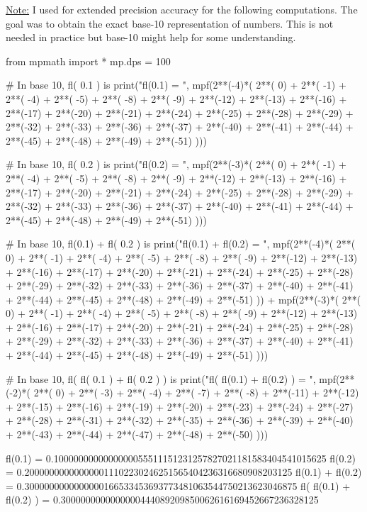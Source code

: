 \documentclass[pdftex,11pt]{article}
\begin{document}
\vspace*{1cm}
\underline{Note:} I used  for extended precision accuracy for the following computations.
The goal was to obtain the exact base-10 representation of numbers. This is not needed in practice but base-10 might help for some understanding.
\begin{python}
from mpmath import *
mp.dps = 100

# In base 10, fl( 0.1 ) is
print("fl(0.1)                 = ", mpf(2**(-4)*(  2**(  0) + 2**( -1) + 2**( -4) + 2**( -5) + 2**( -8) + 2**( -9) + 2**(-12) + 2**(-13) + 2**(-16) + 2**(-17)
         + 2**(-20) + 2**(-21) + 2**(-24) + 2**(-25) + 2**(-28) + 2**(-29) + 2**(-32) + 2**(-33) + 2**(-36) + 2**(-37)
         + 2**(-40) + 2**(-41) + 2**(-44) + 2**(-45) + 2**(-48) + 2**(-49) + 2**(-51) )))

# In base 10, fl( 0.2 ) is
print("fl(0.2)                 = ", mpf(2**(-3)*(  2**(  0) + 2**( -1) + 2**( -4) + 2**( -5) + 2**( -8) + 2**( -9) + 2**(-12) + 2**(-13) + 2**(-16) + 2**(-17)
         + 2**(-20) + 2**(-21) + 2**(-24) + 2**(-25) + 2**(-28) + 2**(-29) + 2**(-32) + 2**(-33) + 2**(-36) + 2**(-37)
         + 2**(-40) + 2**(-41) + 2**(-44) + 2**(-45) + 2**(-48) + 2**(-49) + 2**(-51) )))

# In base 10, fl(0.1) + fl( 0.2 ) is
print("fl(0.1) + fl(0.2)       = ", mpf(2**(-4)*(  2**(  0) + 2**( -1) + 2**( -4) + 2**( -5) + 2**( -8) + 2**( -9) + 2**(-12) + 2**(-13) + 2**(-16) + 2**(-17)
         + 2**(-20) + 2**(-21) + 2**(-24) + 2**(-25) + 2**(-28) + 2**(-29) + 2**(-32) + 2**(-33) + 2**(-36) + 2**(-37)
         + 2**(-40) + 2**(-41) + 2**(-44) + 2**(-45) + 2**(-48) + 2**(-49) + 2**(-51) )) 
         + mpf(2**(-3)*(  2**(  0) + 2**( -1) + 2**( -4) + 2**( -5) + 2**( -8) + 2**( -9) + 2**(-12) + 2**(-13) + 2**(-16) + 2**(-17)
         + 2**(-20) + 2**(-21) + 2**(-24) + 2**(-25) + 2**(-28) + 2**(-29) + 2**(-32) + 2**(-33) + 2**(-36) + 2**(-37)
         + 2**(-40) + 2**(-41) + 2**(-44) + 2**(-45) + 2**(-48) + 2**(-49) + 2**(-51) )))

# In base 10, fl( fl( 0.1 ) + fl( 0.2 ) ) is
print("fl( fl(0.1) + fl(0.2) ) = ", mpf(2**(-2)*(  2**(  0) + 2**( -3) + 2**( -4) + 2**( -7) + 2**( -8) + 2**(-11) + 2**(-12) + 2**(-15) + 2**(-16) + 2**(-19) + 2**(-20)
                  + 2**(-23) + 2**(-24) + 2**(-27) + 2**(-28) + 2**(-31) + 2**(-32) + 2**(-35) + 2**(-36) + 2**(-39) + 2**(-40)
                  + 2**(-43) + 2**(-44) + 2**(-47) + 2**(-48) + 2**(-50) )))
\end{python}
\begin{pythonoutput}
fl(0.1)                 =  0.1000000000000000055511151231257827021181583404541015625
fl(0.2)                 =  0.200000000000000011102230246251565404236316680908203125
fl(0.1) + fl(0.2)       =  0.3000000000000000166533453693773481063544750213623046875
fl( fl(0.1) + fl(0.2) ) =  0.3000000000000000444089209850062616169452667236328125
\end{pythonoutput}
\end{document}
